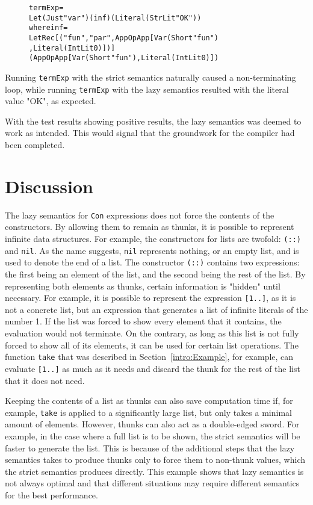 \begin{figure}[H]
\begin{alltt}
  termExp =
    Let (Just "var") (inf) (Literal (StrLit "OK"))
    where inf =
      LetRec [("fun", "par", App OpApp [Var (Short "fun")
                                       ,Literal (IntLit 0)])]
      (App OpApp [Var (Short "fun"), Literal (IntLit 0)])
\end{alltt}
\end{figure}

\noindent Running \texttt{termExp} with the strict semantics naturally caused a
non-terminating loop, while running \texttt{termExp} with the lazy semantics
resulted with the literal value "OK", as expected.

With the test results showing positive results, the lazy semantics was deemed
to work as intended. This would signal that the groundwork for the compiler
had been completed.

\section{Discussion} 

The lazy semantics for \texttt{Con} expressions does not force the contents of
the constructors. By allowing them to remain as thunks, it is possible to
represent infinite data structures. For example, the constructors for lists are
twofold: \texttt{(::)} and \texttt{nil}. As the name suggests, \texttt{nil}
represents nothing, or an empty list, and is used to denote the end of a list.
The constructor \texttt{(::)} contains two expressions: the first being an
element of the list, and the second being the rest of the list.
By representing both elements as thunks, certain information is "hidden" until
necessary. For example, it is possible to represent the expression
\texttt{[1..]}, as it is not a concrete list, but an expression that generates a
list of infinite literals of the number 1.
If the list was forced to show every element that it contains, the evaluation
would not terminate. On the contrary, as long as this list is not fully forced
to show all of its elements, it can be used for certain list operations. The
function \texttt{take} that was described in Section~\ref{intro:Example}, for
example, can evaluate \texttt{[1..]} as much as it needs and discard the thunk
for the rest of the list that it does not need.

Keeping the contents of a list as thunks can also save computation time if,
for example, \texttt{take} is applied to a significantly large list, but only
takes a minimal amount of elements. However, thunks can also
act as a double-edged sword. For example, in the case where a full list is to be
shown, the strict semantics will be faster to generate the list. This is because
of the additional steps that the lazy semantics takes to produce thunks only to
force them to non-thunk values, which the strict semantics produces directly.
This example shows that lazy semantics is not always optimal and that different
situations may require different semantics for the best performance.
